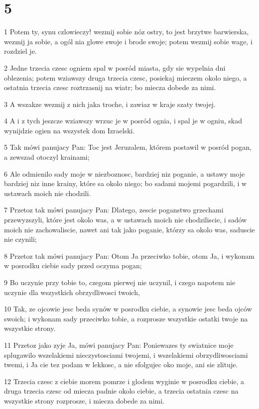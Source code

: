 \chapter{5}

\par 1 Potem ty, synu czlowieczy! wezmij sobie nóz ostry, to jest brzytwe barwierska, wezmij ja sobie, a ogól nia glowe swoje i brode swoje; potem wezmij sobie wage, i rozdziel je.
\par 2 Jedne trzecia czesc ogniem spal w posród miasta, gdy sie wypelnia dni oblezenia; potem wziawszy druga trzecia czesc, posiekaj mieczem okolo niego, a ostatnia trzecia czesc roztrzasnij na wiatr; bo miecza dobede za nimi.
\par 3 A wszakze wezmij z nich jaka troche, i zawiaz w kraje szaty twojej.
\par 4 A i z tych jeszcze wziawszy wrzuc je w posród ognia, i spal je w ogniu, skad wynijdzie ogien na wszystek dom Izraelski.
\par 5 Tak mówi panujacy Pan: Toc jest Jeruzalem, którem postawil w posród pogan, a zewszad otoczyl krainami;
\par 6 Ale odmienilo sady moje w niezboznosc, bardziej niz poganie, a ustawy moje bardziej niz inne krainy, które sa okolo niego; bo sadami mojemi pogardzili, i w ustawach moich nie chodzili.
\par 7 Przetoz tak mówi panujacy Pan: Dlatego, zescie poganstwo grzechami przewyzszyli, które jest okolo was, a w ustawach moich nie chodziliscie, i sadów moich nie zachowaliscie, nawet ani tak jako poganie, którzy sa okolo was, saduscie nie czynili;
\par 8 Przetoz tak mówi panujacy Pan: Otom Ja przeciwko tobie, otom Ja, i wykonam w posrodku ciebie sady przed oczyma pogan;
\par 9 Bo uczynie przy tobie to, czegom pierwej nie uczynil, i czego napotem nie uczynie dla wszystkich obrzydliwosci twoich,
\par 10 Tak, ze ojcowie jesc beda synów w posrodku ciebie, a synowie jesc beda ojców swoich; i wykonam sady przeciwko tobie, a rozprosze wszystkie ostatki twoje na wszystkie strony.
\par 11 Przetoz jako zyje Ja, mówi panujacy Pan: Poniewazes ty swiatnice moje splugawilo wszelakiemi nieczystosciami twojemi, i wszelakiemi obrzydliwosciami twemi, i Ja cie tez podam w lekkosc, a nie sfolgujec oko moje, ani sie zlituje.
\par 12 Trzecia czesc z ciebie morem pomrze i glodem wyginie w posrodku ciebie, a druga trzecia czesc od miecza padnie okolo ciebie, a trzecia ostatnia czesc na wszystkie strony rozprosze, i miecza dobede za nimi.
